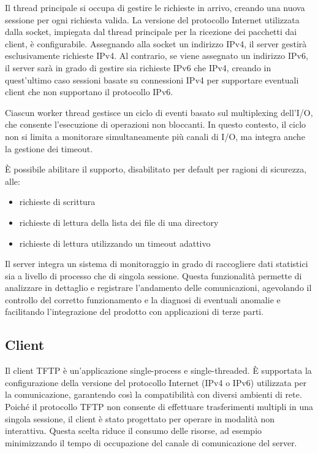 \documentclass[12pt]{article}
\begin{document}
{Il thread principale si occupa di gestire le richieste in arrivo, creando una nuova sessione per ogni richiesta valida. La versione del protocollo Internet utilizzata dalla socket, impiegata dal thread principale per la ricezione dei pacchetti dai client, è configurabile. Assegnando alla socket un indirizzo IPv4, il server gestirà esclusivamente richieste IPv4. Al contrario, se viene assegnato un indirizzo IPv6, il server sarà in grado di gestire sia richieste IPv6 che IPv4, creando in quest'ultimo caso sessioni basate su connessioni IPv4 per supportare eventuali client che non supportano il protocollo IPv6.

Ciascun worker thread gestisce un ciclo di eventi basato sul multiplexing dell'I/O, che consente l'esecuzione di operazioni non bloccanti. In questo contesto, il ciclo non si limita a monitorare simultaneamente più canali di I/O, ma integra anche la gestione dei timeout.

È possibile abilitare il supporto, disabilitato per default per ragioni di sicurezza, alle:
\begin{itemize}
    \item richieste di scrittura
    \item richieste di lettura della lista dei file di una directory
    \item richieste di lettura utilizzando un timeout adattivo
\end{itemize}

Il server integra un sistema di monitoraggio in grado di raccogliere dati statistici sia a livello di processo che di singola sessione. Questa funzionalità permette di analizzare in dettaglio e registrare l'andamento delle comunicazioni, agevolando il controllo del corretto funzionamento e la diagnosi di eventuali anomalie e facilitando l'integrazione del prodotto con applicazioni di terze parti.

\subsection{Client}

Il client TFTP è un'applicazione single-process e single-threaded.
È supportata la configurazione della versione del protocollo Internet (IPv4 o IPv6) utilizzata per la comunicazione, garantendo così la compatibilità con diversi ambienti di rete.
Poiché il protocollo TFTP non consente di effettuare trasferimenti multipli in una singola sessione, il client è stato progettato per operare in modalità non interattiva. Questa scelta riduce il consumo delle risorse, ad esempio minimizzando il tempo di occupazione del canale di comunicazione del server.

}
\end{document}
